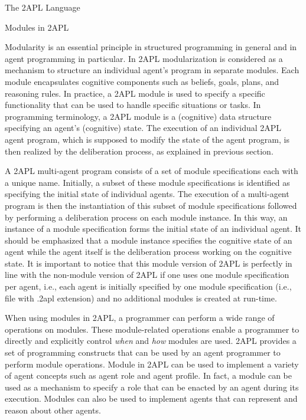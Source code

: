 \begin{chapter}{The 2APL Language}
\begin{section}{Modules in 2APL}

Modularity is an essential principle in structured programming in
general and in agent programming in particular. In 2APL
modularization is considered as a mechanism to structure an
individual agent's program in separate modules. Each module
encapsulates cognitive components such as beliefs, goals, plans, and
reasoning rules. In practice, a 2APL module is used to specify a
specific functionality that can be used to handle specific
situations or tasks. In programming terminology, a 2APL module is a
(cognitive) data structure specifying an agent's (cognitive) state.
The execution of an individual 2APL agent program, which is supposed
to modify the state of the agent program, is then realized by the
deliberation process, as explained in previous section.

A 2APL multi-agent program consists of a set of module
specifications each with a unique name. Initially, a subset of these
module specifications is identified as specifying the initial state
of individual agents. The execution of a multi-agent program is then
the instantiation of this subset of module specifications followed
by performing a deliberation process on each module instance. In
this way, an instance of a module specification forms the initial
state of an individual agent. It should be emphasized that a module
instance specifies the cognitive state of an agent while the agent
itself is the deliberation process working on the cognitive state.
It is important to notice that this module version of 2APL is
perfectly in line with the non-module version of 2APL if one uses
one module specification per agent, i.e., each agent is initially
specified by one module specification (i.e., file with .2apl
extension) and no additional modules is created at run-time.

When using modules in 2APL, a programmer can perform a wide range of
operations on modules. These module-related operations enable a
programmer to directly and explicitly control \textit{when} and
\textit{how} modules are used. 2APL provides a set of programming
constructs that can be used by an agent programmer to perform module
operations. Module in 2APL can be used to implement a variety of
agent concepts such as agent role and agent profile. In fact, a
module can be used as a mechanism to specify a role that can be
enacted by an agent during its execution. Modules can also be used
to implement agents that can represent and reason about other
agents.


\end{section}
\end{chapter}
